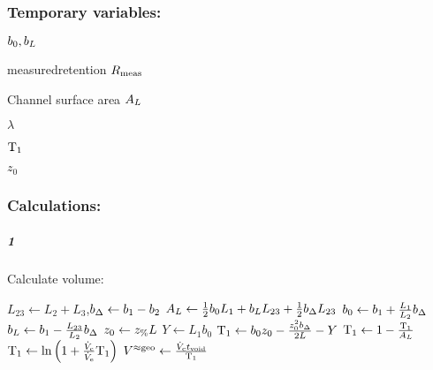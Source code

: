 \subsubsection*{Temporary variables:}
\begin{multicols}{3}
  \begin{packed_item}
    \item $b_0, b_L$
    \item measured\enspace retention $R_\text{meas}$
    \item Channel surface area $A_L$
    \item $\lambda$
    \item $\text{T}_{1}$\textbf{}
    \item $z_0$
  \end{packed_item}
\end{multicols}

\subsubsection*{Calculations:}
\textbf{}
\subparagraph{1}
Calculate volume:


\begin{algorithmic}
  \State $L_{23} \leftarrow L_2 + L_3$,\qquad $b_\Delta \leftarrow b_1 - b_2$
  \State $A_L \leftarrow \frac{1}{2} b_0 L_1 + b_L L_{23} + \frac{1}{2} b_\Delta L_{23}$
  \State $b_0 \leftarrow b_1 + \frac{L_1}{L_2}b_\Delta$
  \State $b_L \leftarrow b_1 - \frac{L_{23}}{L_2}b_\Delta$
  \State $z_0 \leftarrow z_\text{\%} L$
  \State $Y \leftarrow L_1 b_0$
  \State $\text{T}_{1} \leftarrow b_0 z_0 
  - \frac{ z_0^2 b_\Delta  }{  2L} - Y $
  \State $\text{T}_{1} \leftarrow 1 - \frac{\text{T}_{1}}{A_L} $
  \State $\text{T}_{1} \leftarrow \ln{\left( 1 + \frac{\ensuremath{\dot{V}_\text{c}}}{\ensuremath{\dot{V}_\text{e}}} \ensuremath{\text{T}_{1}} \right)}$
  \State $V^{\approx\text{geo}} \leftarrow \frac{\dot{V}_\text{c}t_\text{void}}{\text{T}_{1}}$
\end{algorithmic}


